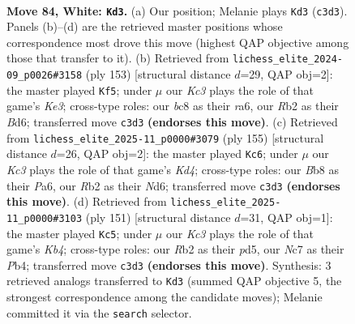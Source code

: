 \documentclass[11pt]{article}
\begin{document}
\clearpage

\begin{figure}[p]\centering
\begin{subfigure}{0.46\textwidth}\centering
\resizebox{\linewidth}{!}{%
\newchessgame
\chessboard[
  setfen={1Bb5/2N5/5k2/1P6/P3B3/2K4p/1R6/6r1 w - - 7 84},
  showmover=false,
  pgfstyle=straightmove, color=movearrow, markmove={c3-d3}
]}
\caption{}
\end{subfigure}\hfill
\begin{subfigure}{0.46\textwidth}\centering
\resizebox{\linewidth}{!}{%
\newchessgame
\chessboard[
  setfen={8/8/R1nbk1p1/7p/4bp1P/8/1B6/6K1 b - - 1 77},
  showmover=false,
  pgfstyle=straightmove, color=movearrow, markmove={e6-f5}
]}
\caption{}
\end{subfigure}
\\[4pt]
\begin{subfigure}{0.46\textwidth}\centering
\resizebox{\linewidth}{!}{%
\newchessgame
\chessboard[
  setfen={8/8/p2n4/Pbpk3R/5K2/8/8/4B3 b - - 34 78},
  showmover=false,
  pgfstyle=straightmove, color=movearrow, markmove={d5-c6}
]}
\caption{}
\end{subfigure}\hfill
\begin{subfigure}{0.46\textwidth}\centering
\resizebox{\linewidth}{!}{%
\newchessgame
\chessboard[
  setfen={8/1R6/8/1k1P4/1p1bPB2/pP4K1/r7/8 b - - 1 76},
  showmover=false,
  pgfstyle=straightmove, color=movearrow, markmove={b5-c5}
]}
\caption{}
\end{subfigure}
\caption{\textbf{Move 84, White: \texttt{Kd3}.} (a) Our position; Melanie plays \texttt{Kd3} (\texttt{c3d3}). Panels (b)--(d) are the retrieved master positions whose correspondence most drove this move (highest QAP objective among those that transfer to it). (b) Retrieved from \texttt{lichess\_elite\_2024-09\_p0026\#3158} (ply 153) [structural distance $d$=29, QAP obj=2]: the master played \texttt{Kf5}; under $\mu$ our \emph{Kc3} plays the role of that game's \emph{Ke3}; cross-type roles: our \emph{b}c8 as their \emph{r}a6, our \emph{R}b2 as their \emph{B}d6; transferred move \texttt{c3d3} \textbf{(endorses this move)}. (c) Retrieved from \texttt{lichess\_elite\_2025-11\_p0000\#3079} (ply 155) [structural distance $d$=26, QAP obj=2]: the master played \texttt{Kc6}; under $\mu$ our \emph{Kc3} plays the role of that game's \emph{Kd4}; cross-type roles: our \emph{B}b8 as their \emph{P}a6, our \emph{R}b2 as their \emph{N}d6; transferred move \texttt{c3d3} \textbf{(endorses this move)}. (d) Retrieved from \texttt{lichess\_elite\_2025-11\_p0000\#3103} (ply 151) [structural distance $d$=31, QAP obj=1]: the master played \texttt{Kc5}; under $\mu$ our \emph{Kc3} plays the role of that game's \emph{Kb4}; cross-type roles: our \emph{R}b2 as their \emph{p}d5, our \emph{N}c7 as their \emph{P}b4; transferred move \texttt{c3d3} \textbf{(endorses this move)}. Synthesis: 3 retrieved analogs transferred to \texttt{Kd3} (summed QAP objective 5, the strongest correspondence among the candidate moves); Melanie committed it via the \texttt{search} selector.}
\label{fig:thought-m166}
\end{figure}
\end{document}

